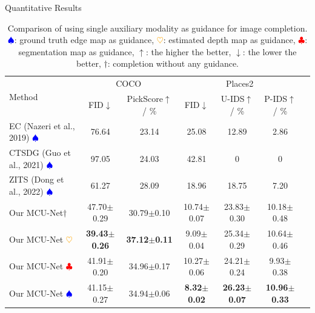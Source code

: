 \documentclass[pdf]{beamer}
\begin{document}
\begin{frame}[shrink=13]{Quantitative Results}
    \scriptsize
    \vspace{1.2cm}
    \begin{table}[h]
        \centering
        \begin{tabular}{@{}lcccccc@{}}
        \toprule
        \multirow{2}{*}{Method} & \multicolumn{2}{c}{COCO} & \multicolumn{3}{c}{Places2} \\
        \cmidrule(lr){2-3} \cmidrule(lr){4-6}
         & FID$\downarrow$ & PickScore$\uparrow$ / \% & FID$\downarrow$ & U-IDS$\uparrow$ / \% & P-IDS$\uparrow$ / \% \\
        \midrule
        EC (Nazeri et al., 2019) \textcolor{blue}{$\spadesuit$} & 76.64 & 23.14 & 25.08 & 12.89 & 2.86 \\
        CTSDG (Guo et al., 2021) \textcolor{blue}{$\spadesuit$} & 97.05 & 24.03 & 42.81 & 0 & 0 \\
        ZITS (Dong et al., 2022) \textcolor{blue}{$\spadesuit$} & 61.27 & 28.09 & 18.96 & 18.75 & 7.20 \\
        \midrule
        Our MCU-Net$\dagger$ & 47.70$\pm$0.29 & 30.79$\pm$0.10 & 10.74$\pm$0.07 & 23.83$\pm$0.30 & 10.18$\pm$0.48 \\
        Our MCU-Net \textcolor{orange}{$\heartsuit$} & \textbf{39.43$\pm$0.26} & \textbf{37.12$\pm$0.11} & 9.09$\pm$0.04 & 25.34$\pm$0.29 & 10.64$\pm$0.46 \\
        Our MCU-Net \textcolor{red}{$\clubsuit$} & 41.91$\pm$0.20 & 34.96$\pm$0.17 & 10.27$\pm$0.06 & 24.21$\pm$0.24 & 9.93$\pm$0.38 \\
        Our MCU-Net \textcolor{blue}{$\spadesuit$} & 41.15$\pm$0.27 & 34.94$\pm$0.06 & \textbf{8.32$\pm$0.02} & \textbf{26.23$\pm$0.07} & \textbf{10.96$\pm$0.33} \\
        \bottomrule
        \end{tabular}
        \caption{Comparison of using single auxiliary modality as guidance for image completion. \textcolor{blue}{$\spadesuit$}: ground truth edge map as guidance, \textcolor{orange}{$\heartsuit$}: estimated depth map as guidance, \textcolor{red}{$\clubsuit$}: segmentation map as guidance, $\uparrow$: the higher the better, $\downarrow$: the lower the better, $\dagger$: completion without any guidance.}
    \end{table}
\end{frame}
\end{document}
